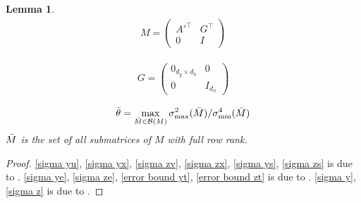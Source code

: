\documentclass{article}
\theoremstyle{plain}
\newtheorem{lemma}[theorem]{Lemma}
\theoremstyle{definition}
\theoremstyle{remark}
\begin{document}
\begin{lemma}
\begin{align*}
   M =
    \begin{pmatrix}
        A'^\top & G^\top \\
        0 & I
    \end{pmatrix}
\end{align*}

\begin{align*}
   G =
    \begin{pmatrix}
        0_{d_y\times d_h} & 0 \\
        0 & I_{d_h}
    \end{pmatrix}
\end{align*}

\begin{align*}
    \Bar{\theta}=\max_{\Bar{M}\in \mathcal{B}(M)}\sigma^2_{\max}(\Bar{M})/\sigma^4_{\min}(\Bar{M})
\end{align*}
$\Bar{M}$ is the set of all submatrices of $M$ with full row rank.
\end{lemma}
\begin{proof}
    \eqref{sigma yu}, \eqref{sigma yx}, \eqref{sigma zv}, \eqref{sigma zx}, \eqref{sigma ys}, \eqref{sigma zs} is due to . \eqref{sigma ye}, \eqref{sigma ze}, \eqref{error bound yt}, \eqref{error bound zt} is due to . \eqref{sigma y}, \eqref{sigma z} is due to .
\end{proof}
\end{document}

